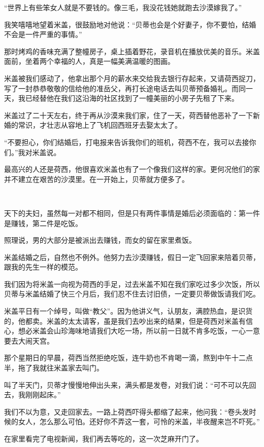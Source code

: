 \par “世界上有些笨女人就是不要钱的。像三毛，我没花钱她就跑去沙漠嫁我了。”
\par 我笑嘻嘻地望着米盖，很鼓励地对他说：“贝蒂也会是个好妻子，你不要怕，结婚不会是一件严重的事情。”
\par 那时烤鸡的香味充满了整幢房子，桌上插着野花，录音机在播放优美的音乐。米盖面前，坐着两个幸福的人，真是一幅美满温暖的图画。
\par 米盖被我们感动了，他拿出那个月的薪水来交给我去银行存起来，又请荷西捉刀，写了一封恭恭敬敬的信给他的准岳父，再打长途电话去叫贝蒂预备婚礼。而同一天，我已经替他在我们这沿海的社区找到了一幢美丽的小房子先租了下来。
\par 米盖过了二十天左右，终于再从沙漠来我们家，住了一天，荷西替他恶补了一下新婚的常识，才壮志从容地上了飞机回西班牙去娶太太了。
\par “不要担心，你们结婚后，打电报来告诉我你们的班机，荷西不在，我可以去接你们。”我对米盖说。
\par 最高兴的人还是荷西，他很喜欢米盖也有了一个像我们这样的家。更何况他们的家并不建立在艰苦的沙漠里。在一开始上，贝蒂就方便多了。
\par  
\par 天下的夫妇，虽然每一对都不相同，但是只有两件事情是婚后必须面临的：第一件是赚钱，第二件是吃饭。
\par 照理说，男的大部分是被派出去赚钱，而女的留在家里煮饭。
\par 米盖结婚之后，自然也不例外。他努力去沙漠赚钱，假日一定飞回家来陪着贝蒂，跟我的先生一样的模范。
\par 我们因为将米盖一向视为荷西的手足，过去米盖不知在我们家吃过多少次饭，所以贝蒂与米盖结婚了快三个月后，我们忍不住去讨旧债，一定要贝蒂做饭请我们吃。
\par 米盖平日有一个绰号，叫做“教父”。因为他讲义气，认朋友，满腔热血，是识货的，他都卖。米盖的太太请客，虽是我们去吵出来的结果，但是荷西对米盖有信心，想必米盖会山珍海味地请我们大吃一场，所以前一日就不肯多吃饭，一心一意要去大闹天宫。
\par 那个星期日的早晨，荷西当然拒绝吃饭，连牛奶也不肯喝一滴，熬到中午十二点半，拖了我就往米盖家去叫门。
\par 叫了半天门，贝蒂才慢慢地伸出头来，满头都是发卷，对我们说：“可不可以先回去，我刚刚起床。”
\par 我们不以为意，又走回家去。一路上荷西吓得头都缩了起来，他问我：“卷头发时候的女人，怎么那么可怕。还好你不弄这一套，可怜的米盖，半夜醒来岂不吓死。”
\par 在家里看完了电视新闻，我们再去等吃的，这一次芝麻开门了。

